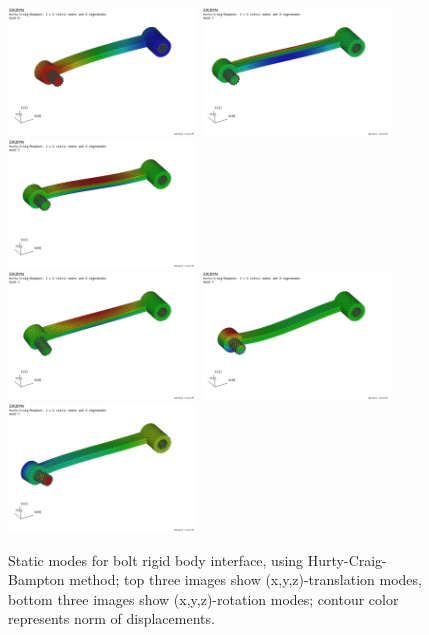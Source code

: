 \begin{figure}[tbph]
  \begin{center}
  \includegraphics[width=5cm]{figures/modesHinge/HCBmodesHingeStaticAx}
  \includegraphics[width=5cm]{figures/modesHinge/HCBmodesHingeStaticAy}
  \includegraphics[width=5cm]{figures/modesHinge/HCBmodesHingeStaticAz}\\
  \includegraphics[width=5cm]{figures/modesHinge/HCBmodesHingeStaticArotX}
  \includegraphics[width=5cm]{figures/modesHinge/HCBmodesHingeStaticArotY}
  \includegraphics[width=5cm]{figures/modesHinge/HCBmodesHingeStaticArotZ}
  \end{center}
  \caption{Static modes for bolt rigid body interface, using Hurty-Craig-Bampton method; top three images show (x,y,z)-translation modes, bottom three images show (x,y,z)-rotation modes; contour color represents norm of displacements.}
	\label{fig_hingePartStaticModesA}
\end{figure}

